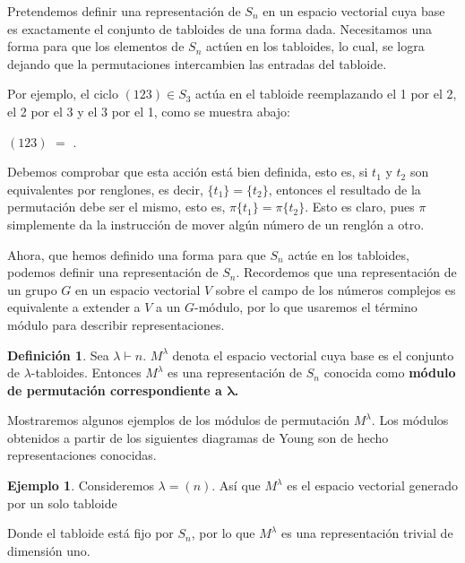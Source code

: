 \documentclass[12pt]{book}
\theoremstyle{definition}
\newtheorem{definition}[theorem]{Definición}
\newtheorem{example}[theorem]{Ejemplo}
\newcounter{in}
\newcounter{ini}
\begin{document}
Pretendemos definir una representación de $S_{n}$ en un espacio
vectorial cuya base es exactamente el conjunto de tabloides de una
forma dada. Necesitamos una forma para que los elementos de $S_{n}$
actúen en los tabloides, lo cual, se logra dejando que la permutaciones intercambien las entradas del
tabloide.

Por ejemplo, el ciclo $(123)\in S_{3}$ actúa en el tabloide
reemplazando el 1 por el 2, el 2 por el 3 y el 3 por el 1, como se
muestra abajo:
\begin{center}
  $(123)$
  \quad$=$\quad
  \quad .
\end{center}

Debemos comprobar que esta acción está bien definida, esto es, si $t_{1}$
y $t_{2}$ son equivalentes por renglones, es decir,
$\{t_{1}\}=\{t_{2}\}$, entonces el resultado de la permutación debe
ser el mismo, esto es, $\pi\{t_{1}\}=\pi\{t_{2}\}$. Esto es claro,
pues $\pi$ simplemente da la instrucción de mover algún número de un
renglón a otro.

Ahora, que hemos definido una forma para que $S_{n}$ actúe en los tabloides,
podemos definir una representación de $S_{n}$. Recordemos que una
representación de un grupo $G$ en un espacio vectorial $V$ sobre el
campo de los números complejos es equivalente a extender a $V$ a un $G$-módulo,
por lo que usaremos el término módulo para describir representaciones.

\begin{definition}
  Sea $\lambda\vdash n$. $M^{\lambda}$ denota el espacio vectorial
  cuya base es el conjunto de $\lambda$-tabloides. Entonces
  $M^{\lambda}$ es una representación de $S_{n}$ conocida como \textbf{módulo
  de permutación correspondiente a $\boldsymbol{\lambda}$.}
\end{definition}

Mostraremos algunos ejemplos de los módulos de
permutación $M^{\lambda}$. Los módulos obtenidos a partir de los siguientes diagramas de
Young son de hecho representaciones conocidas.

\begin{center}
   \qquad
  \qquad
\end{center}

\begin{example}
  Consideremos $\lambda=(n)$. Así que $M^{\lambda}$ es el espacio
  vectorial generado por un solo tabloide 
  \begin{center}
  \end{center}
Donde el tabloide está fijo por $S_{n}$, por lo que $M^{\lambda}$ es
una representación trivial de dimensión uno.
\end{example}
\end{document}
